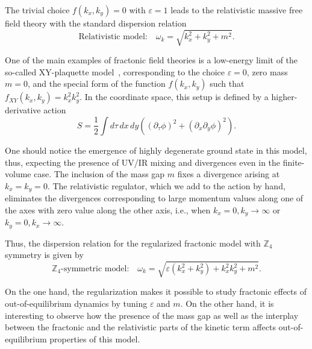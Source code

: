 \documentclass[a4paper,12pt]{article}
\newcommand{\be}{\begin{equation}}
\newcommand{\ee}{\end{equation}}
\newcommand{\skipline}{\vspace{\baselineskip}}
\newcommand{\eps}{\varepsilon}
\newcommand{\om}{\omega}
\newcommand{\Z}[1]{\mathbb{Z}_{#1}}
\begin{document}
The trivial choice $f(k_x, k_y)=0$ with $\eps = 1$ leads to the relativistic massive free field theory with the standard dispersion relation
\be 
    \text{Relativistic model:} \quad \om_k = \sqrt{k_x^2 + k_y^2 + m^2}.
    \label{eq:reldisprel}
\ee

One of the main examples of fractonic field theories is a low-energy limit of the so-called XY-plaquette model~\cite{Seiberg:2020bhn}, corresponding to the choice $\eps = 0$, zero mass $m = 0$, and the special form of the function $f(k_x,k_y)$ such that $f_{XY}(k_x,k_y) = k_x^2 k_y^2$. In the coordinate space, this setup is defined by a higher-derivative action
\be
    S = \frac{1}{2}\int d\tau\,dx\,dy \left((\partial_{\tau}\phi)^2 + (\partial_x\partial_y\phi)^2\right).
    \label{eq:Fracton_action}
\ee

One should notice the emergence of highly degenerate ground state in this model, thus, expecting the presence of UV/IR mixing and divergences even in the finite-volume case. The inclusion of the mass gap $m$ fixes a divergence arising at $k_x = k_y = 0$. The relativistic regulator, which we add to the action by hand, eliminates the divergences corresponding to large momentum values along one of the axes with zero value along the other axis, i.e., when $k_x = 0, k_y \to \infty$ or $k_y = 0, k_x \to \infty$. 

Thus, the dispersion relation for the regularized fractonic model with $\Z4$ symmetry is given by
\be 
    \Z4\text{-symmetric model:} \quad \om_k = \sqrt{\eps\left(k_x^2 + k_y^2\right) + k_x^2 k_y^2 + m^2}.
    \label{eq:Z4disprel}
\ee

On the one hand, the regularization makes it possible to study fractonic effects of out-of-equilibrium dynamics by tuning $\eps$ and $m$. On the other hand, it is interesting to observe how the presence of the mass gap as well as the interplay between the fractonic and the relativistic parts of the kinetic term affects out-of-equilibrium properties of this model.

\skipline
\end{document}
